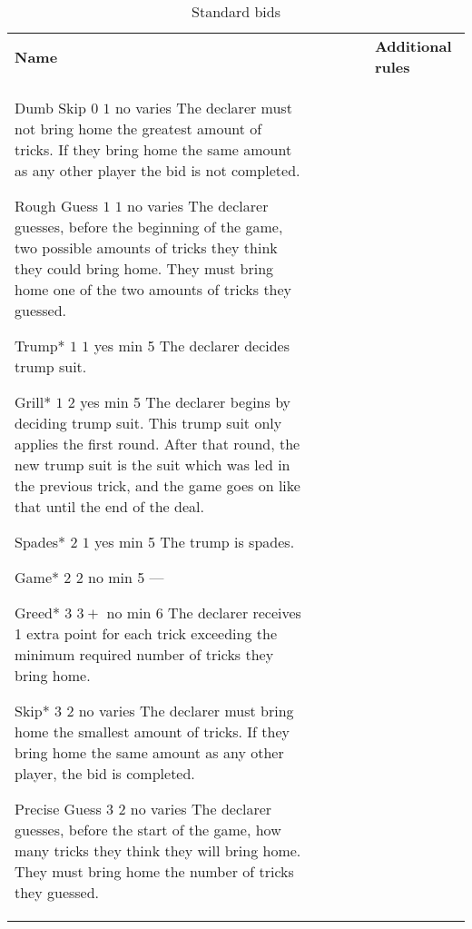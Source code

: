 \begin{table}
	\caption{Standard bids}\label{tab:standardBids}
	\begin{center}
		\begin{tabularx}{\textwidth}{lcccc|X}
				\textbf{Name} &
				\rotccw{\textbf{Worth}} &
				\rotccw{\textbf{Score}} &
				\rotccw{\textbf{Trump}} &
				\rotccw{\textbf{Tricks}} &
				\textbf{Additional rules}
				\\[-3ex]

				\standardBidItem%
				{Dumb Skip}
				{$0$}
				{$1$}
				{no}
				{varies}
				{%
					The declarer must not bring home the greatest amount of tricks. If they bring home the same amount as any other player the bid is not completed.
				}

				\standardBidItem%
				{Rough Guess}
				{$1$}
				{$1$}
				{no}
				{varies}
				{%
					The declarer guesses, before the beginning of the game, two possible amounts of tricks they think they could bring home. They must bring home one of the two amounts of tricks they guessed.
				}

				\standardBidItem%
				{Trump*}
				{$1$}
				{$1$}
				{yes}
				{min 5}
				{%
					The declarer decides trump suit.
				}

				\standardBidItem%
				{Grill*}
				{$1$}
				{$2$}
				{yes}
				{min 5}
				{%
					The declarer begins by deciding trump suit. This trump suit only applies the first round. After that round, the new trump suit is the suit which was led in the previous trick, and the game goes on like that until the end of the deal.
				}
				
				\standardBidItem%
				{Spades*}
				{$2$}
				{$1$}
				{yes}
				{min 5}
				{%
					The trump is spades.
				}

				\standardBidItem%
				{Game*}
				{$2$}
				{$2$}
				{no}
				{min 5}
				{%
					---
				}

				\standardBidItem%
				{Greed*}
				{$3$}
				{$3+$}
				{no}
				{min 6}
				{%
					The declarer receives 1 extra point for each trick exceeding the minimum required number of tricks they bring home.
				}

				\standardBidItem%
				{Skip*}
				{$3$}
				{$2$}
				{no}
				{varies}
				{%
					The declarer must bring home the smallest amount of tricks. If they bring home the same amount as any other player, the bid is completed.
				}

				\standardBidItem%
				{Precise Guess}
				{$3$}
				{$2$}
				{no}
				{varies}
				{%
					The declarer guesses, before the start of the game, how many tricks they think they will bring home. They must bring home the number of tricks they guessed.
				}


\end{tabularx}
\end{center}
\end{table}
